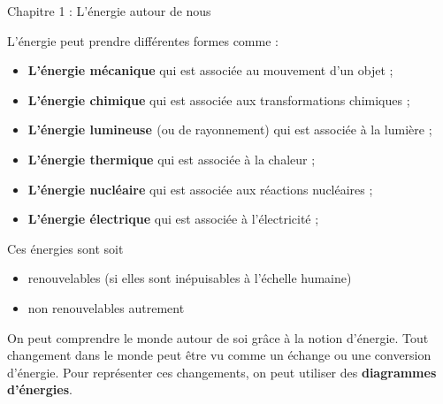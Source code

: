 \documentclass[24pt]{article}
\newcommand{\titre}{Chapitre 1 : L'énergie autour de nous} %
\begin{document}
\thispagestyle{fancy}
\cfoot{}

\begin{titlebox}{\titre}
    \setlength\parindent{4pt} %
    \setlength\parskip{5pt} 

    L’énergie peut prendre différentes formes comme :
    \begin{itemize}
        \item \textbf{\color{DarkRed} {L’énergie mécanique}} qui est associée au mouvement d’un objet ;
        \item \textbf{\color{DarkRed} {L’énergie chimique}} qui est associée aux transformations chimiques ;
        \item \textbf{\color{DarkRed} {L’énergie lumineuse }}(ou de rayonnement) qui est associée à la lumière ;
        \item \textbf{\color{DarkRed} {L’énergie thermique}} qui est associée à la chaleur ;
        \item \textbf{\color{DarkRed} {L’énergie nucléaire}} qui est associée aux réactions nucléaires ;
        \item \textbf{\color{DarkRed} {L’énergie électrique}} qui est associée à l'électricité ;
    \end{itemize}

    Ces énergies sont soit \begin{itemize}
        \item renouvelables (si elles sont inépuisables à l'échelle humaine)
        \item non renouvelables autrement
    \end{itemize}

    
    \vspace{50pt}
    On peut comprendre le monde autour de soi grâce à la notion d'énergie. Tout changement dans le monde 
    peut être vu comme un échange ou une conversion d'énergie.
    Pour représenter ces changements, on peut utiliser des \textbf{\color{DarkRed} {diagrammes d'énergies}}.


\end{titlebox}
\end{document}
